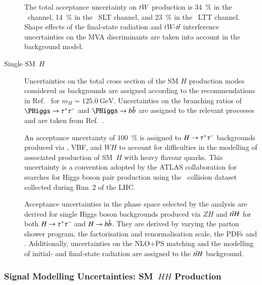 \begin{description}
  The total acceptance uncertainty on $tW$~production is \SI{34}{\percent} in
  the \hadhad~channel, \SI{14}{\percent} in the \lephad~SLT channel, and
  \SI{23}{\percent} in the \lephad~LTT channel. Shape effects of the final-state
  radiation and $tW$-$t\bar{t}$ interference uncertainties on the MVA
  discriminants are taken into account in the background model.

\item[Single SM~$H$] Uncertainties on the total cross section of the SM $H$
  production modes considered as backgrounds are assigned according to the
  recommendations in Ref.~\cite{deFlorian:2016spz_book} for
  $m_{H} = \SI{125.0}{\GeV}$. Uncertainties on the branching ratios of
  $\PHiggs \to \tautau$ and $\PHiggs \to \bbbar$ are assigned to the relevant
  processes and are taken from Ref.~\cite{deFlorian:2016spz_book}.

  An acceptance uncertainty of \SI{100}{\percent} is assigned to $H \to \tau^{+} \tau^{-}$
  backgrounds produced via \ggF, VBF, and $WH$ to account for difficulties in
  the modelling of associated production of SM~$H$ with heavy flavour
  quarks. This uncertainty is a convention adopted by the ATLAS collaboration
  for searches for Higgs boson pair production using the \pp~collision dataset
  collected during Run~2 of the LHC.

  Acceptance uncertainties in the phase space selected by the analysis are
  derived for single Higgs boson backgrounds produced via $ZH$ and $t\bar{t} H$
  for both $H \to \tau^{+} \tau^{-}$ and $H \to b\bar{b}$. They are derived by varying the
  parton shower program, the factorisation and renormalisation scale, the PDFs
  and \alphas. Additionally, uncertainties on the NLO+PS matching and the
  modelling of initial- and final-state radiation are assigned to the $t\bar{t} H$
  background.
\end{description}





\subsubsection{Signal Modelling Uncertainties: SM~$HH$ Production}

